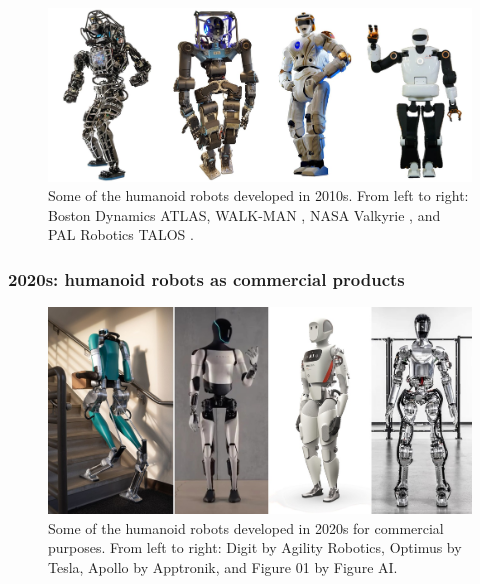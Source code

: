 \begin{figure}
    \centering
    \includegraphics[width=\textwidth]{figures/01-introduction/robots-in-2010.jpg}
    \caption{Some of the humanoid robots developed in 2010s. From left to right:
        Boston Dynamics ATLAS,
        WALK-MAN \cite{Tsagarakis2017WALKMAN},
        NASA Valkyrie \cite{Radford2015Valkyrie}, and
        PAL Robotics TALOS \cite{Stasse2017TALOS}.}
    \label{fig:introduction:robots-in-2010}
\end{figure}

\subsubsection{2020s: humanoid robots as commercial products}
\begin{figure}
    \centering
    \includegraphics[width=\textwidth]{figures/01-introduction/robots-in-2020.jpg}
    \caption{Some of the humanoid robots developed in 2020s for commercial
        purposes. From left to right:
        Digit by Agility Robotics, Optimus by Tesla, Apollo by Apptronik, and
        Figure 01 by Figure AI.
    }
    \label{fig:introduction:robots-in-2020}
\end{figure}

